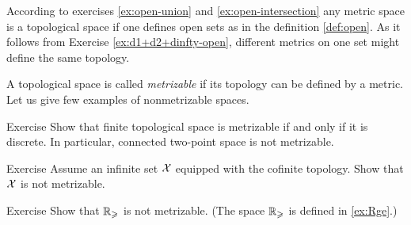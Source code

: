 According to exercises \ref{ex:open-union} and \ref{ex:open-intersection} any metric space is a topological space if one defines open sets as in the definition \ref{def:open}.
As it follows from Exercise \ref{ex:d1+d2+dinfty-open},
different metrics on one set might define the same topology.

A topological space is called \emph{metrizable} if its topology can be defined by a metric.
Let us give few examples of nonmetrizable spaces.

\begin{thm}{Exercise}\label{ex:finite+metrizable}
Show that finite topological space is metrizable if and only if it is discrete.
In particular, connected two-point space is not metrizable.
\end{thm}

\begin{thm}{Exercise}
Assume an infinite set $\mathcal{X}$ equipped with the cofinite topology.
Show that $\mathcal{X}$ is not metrizable.
\end{thm}

\begin{thm}{Exercise}
Show that $\mathbb{R}_\geqslant$ is not metrizable.
(The space $\mathbb{R}_\geqslant$ is defined in \ref{ex:Rge}.)
\end{thm}
